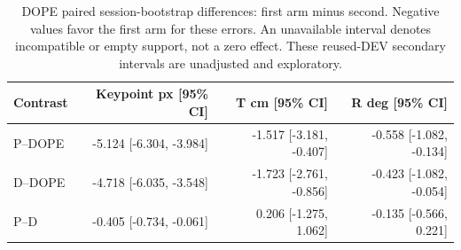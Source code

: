 \begin{table}[t]\centering\small
\caption{DOPE paired session-bootstrap differences: first arm minus second. Negative values favor the first arm for these errors. An unavailable interval denotes incompatible or empty support, not a zero effect. These reused-DEV secondary intervals are unadjusted and exploratory.}\label{tab:dopepaired}
\begin{tabular}{lrrr}\toprule
Contrast & Keypoint px [95\% CI] & T cm [95\% CI] & R deg [95\% CI]\\\midrule
P--DOPE & -5.124 [-6.304, -3.984] & -1.517 [-3.181, -0.407] & -0.558 [-1.082, -0.134]\\
D--DOPE & -4.718 [-6.035, -3.548] & -1.723 [-2.761, -0.856] & -0.423 [-1.082, -0.054]\\
P--D & -0.405 [-0.734, -0.061] & 0.206 [-1.275, 1.062] & -0.135 [-0.566, 0.221]\\
\bottomrule\end{tabular}
\end{table}

